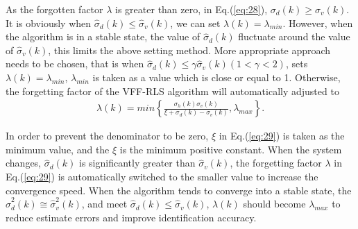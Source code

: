 \documentclass{article}
\begin{document}
As the forgotten factor $\lambda$ is greater than zero, in
Eq.(\ref{eq:28}), $\sigma_d(k)\geq\sigma_v(k)$.
It is obviously when $\hat{\sigma}_d(k)\leq\hat{\sigma}_v(k)$, we
can set $\lambda(k)=\lambda_{min}$. However, when the algorithm is
in a stable state, the value of $\hat{\sigma}_d(k)$ fluctuate around
the value of $\hat{\sigma}_v(k)$, this limits
the above setting method. More appropriate approach needs to be
chosen, that is when $\hat{\sigma}_d(k)\leq\gamma\hat{\sigma}_v(k)(1<\gamma<2)$,
 sets $\lambda(k)=\lambda_{min}$, $\lambda_{min}$ is taken as a
value which is close or equal to 1. Otherwise, the forgetting
factor of the VFF-RLS algorithm will
automatically adjusted to
\begin{eqnarray}
  \lambda(k)=min\left\{
  \frac{\sigma_h(k)\sigma_v(k)}{\xi+\sigma_d(k) - \sigma_v(k)}, \lambda_{max}\right\}.     \label{eq:29}
\end{eqnarray}

In order to prevent the denominator to be zero, $\xi$ in
Eq.(\ref{eq:29}) is taken as the minimum value, and the $\xi$
is the minimum positive constant.
When the system changes, $\hat{\sigma}_d(k)$ is significantly greater
than $\hat{\sigma}_v(k)$, the forgetting factor $\lambda$ in Eq.(\ref{eq:29})
is automatically switched to the smaller value to
increase the convergence speed.
When the algorithm tends to converge into a stable state, the
$\hat{\sigma}^2_d(k) \cong \hat{\sigma}^2_v(k)$, and meet
$\hat{\sigma}_d(k) \leq \hat{\sigma}_v(k)$, $\lambda(k)$ should become
$\lambda_{max}$ to reduce estimate errors and improve identification
accuracy.
\end{document}
